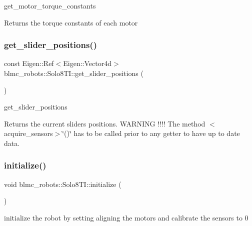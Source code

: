 get\+\_\+motor\+\_\+torque\+\_\+constants 

\begin{DoxyReturn}{Returns}
the torque constants of each motor 
\end{DoxyReturn}
\mbox{\label{classblmc__robots_1_1Solo8TI_ac02884b8402b774ce51c30be6fb4eda6}} 
\subsubsection{\texorpdfstring{get\+\_\+slider\+\_\+positions()}{get\_slider\_positions()}}
{\footnotesize\ttfamily const Eigen\+::\+Ref$<$Eigen\+::\+Vector4d$>$ blmc\+\_\+robots\+::\+Solo8\+T\+I\+::get\+\_\+slider\+\_\+positions (\begin{DoxyParamCaption}{ }\end{DoxyParamCaption})\hspace{0.3cm}{\ttfamily [inline]}}



get\+\_\+slider\+\_\+positions 

\begin{DoxyReturn}{Returns}
the current sliders positions. W\+A\+R\+N\+I\+NG !!!! The method $<$acquire\+\_\+sensors$>$\char`\"{}()\char`\"{} has to be called prior to any getter to have up to date data. 
\end{DoxyReturn}
\mbox{\label{classblmc__robots_1_1Solo8TI_adf9f5ed10293942b1ce06d0d0116f61c}} 
\subsubsection{\texorpdfstring{initialize()}{initialize()}}
{\footnotesize\ttfamily void blmc\+\_\+robots\+::\+Solo8\+T\+I\+::initialize (\begin{DoxyParamCaption}{ }\end{DoxyParamCaption})}



initialize the robot by setting aligning the motors and calibrate the sensors to 0 

